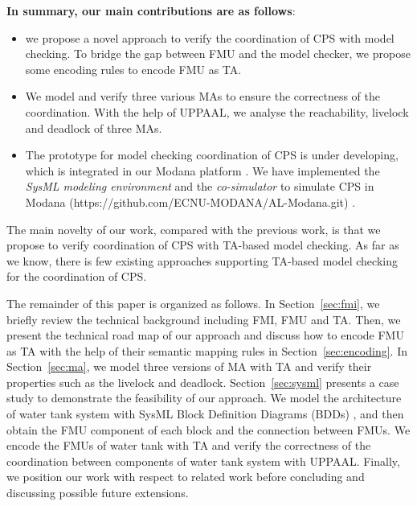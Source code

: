 \textbf{In summary, our main contributions are as follows}:
\begin{itemize}
\item
we propose a novel approach to verify the coordination of CPS with model checking. To bridge the gap between FMU and the model checker, we propose some encoding rules to encode FMU as TA.
\item
We model and verify three various MAs to ensure the correctness of the coordination. With the help of UPPAAL, we analyse the reachability, livelock and deadlock of three MAs.
\item
The prototype for model checking coordination of CPS is under developing, which is integrated in our Modana platform \cite{Cheng2015Modana}. We have implemented the \textit{SysML modeling environment} and the \textit{co-simulator} to simulate CPS in Modana (https://github.com/ECNU-MODANA/AL-Modana.git) \cite{Fritzson1998Modelica}.
\end{itemize}
The main novelty of our work, compared with the previous work, is that we propose to verify coordination of CPS with TA-based model checking. As far as we know, there is few existing approaches supporting TA-based model checking for the coordination of CPS.

The remainder of this paper is organized as follows. In Section~\ref{sec:fmi}, we briefly review the technical background including FMI, FMU and TA. Then, we present the technical road map of our approach and discuss how to encode FMU as TA with the help of their semantic mapping rules in Section~\ref{sec:encoding}. In Section~\ref{sec:ma}, we model three versions of MA with TA and verify their properties such as the livelock and deadlock. Section~\ref{sec:sysml} presents a case study to demonstrate the feasibility of our approach. We model the architecture of water tank system with SysML Block Definition Diagrams (BDDs) \cite{SemerathBHSV17}, and then obtain the FMU component of each block and the connection between FMUs. We encode the FMUs of water tank with TA and verify the correctness of the coordination between components of water tank system with UPPAAL. Finally, we position our work with respect to related work before concluding and discussing possible future extensions.




















